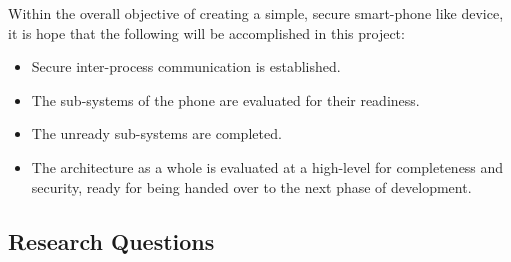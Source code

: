 \label{Ch1 Sec2 Sub2}

Within the overall objective of creating a simple, secure smart-phone like device, it is hope that the following will be accomplished in this project:

\begin{itemize}
\item Secure inter-process communication is established.
\item The sub-systems of the phone are evaluated for their readiness.
\item The unready sub-systems are completed.
\item The architecture as a whole is evaluated at a high-level for completeness and security, ready for being handed over to the next phase of development.
\end{itemize} 


\subsection{Research Questions}

\label{Ch1 Sec2 Sub3}

